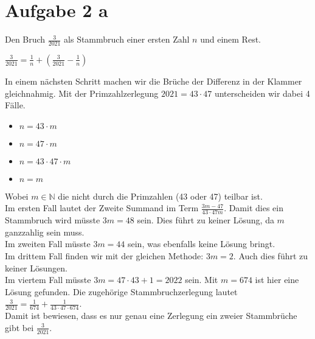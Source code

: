 \documentclass{article}
\begin{document}
\section*{Aufgabe 2 a}
Den Bruch $\frac{3}{2021}$ als Stammbruch einer ersten Zahl $n$ und einem Rest.
\begin{center}
    $\frac{3}{2021} = \frac{1}{n} + (\frac{3}{2021} - \frac{1}{n})$
\end{center}
In einem nächsten Schritt machen wir die Brüche der Differenz in der Klammer gleichnahmig. Mit der Primzahlzerlegung $2021 = 43 \cdot 47$ unterscheiden wir dabei 4 Fälle.
\begin{itemize}
    \item $n = 43 \cdot m$
    \item $n = 47 \cdot m$
    \item $n = 43 \cdot 47 \cdot m$
    \item $n = m$
\end{itemize}
Wobei \(m \in \mathbb{N}\) die nicht durch die Primzahlen (43 oder 47) teilbar ist.\\Im ersten Fall lautet der Zweite Summand im Term \(\frac{3m-47}{43 \cdot 47m}\). Damit dies ein Stammbruch wird müsste \(3m = 48\) sein. Dies führt zu keiner Lösung, da \(m\) ganzzahlig sein muss.\\Im zweiten Fall müsste \(3m = 44\) sein, was ebenfalls keine Lösung bringt.\\
Im drittem Fall finden wir mit der gleichen Methode: \(3m = 2\). Auch dies führt zu keiner Lösungen.\\
Im viertem Fall müsste \(3m = 47 \cdot 43 + 1 = 2022\) sein. Mit \(m = 674\) ist hier eine Lösung gefunden. Die zugehörige Stammbruchzerlegung lautet \(\frac{3}{2021} = \frac{1}{674} + \frac{1}{43 \cdot 47 \cdot 674}\).\\
Damit ist bewiesen, dass es nur genau eine Zerlegung ein zweier Stammbrüche gibt bei \(\frac{3}{2021}\).
\end{document}
